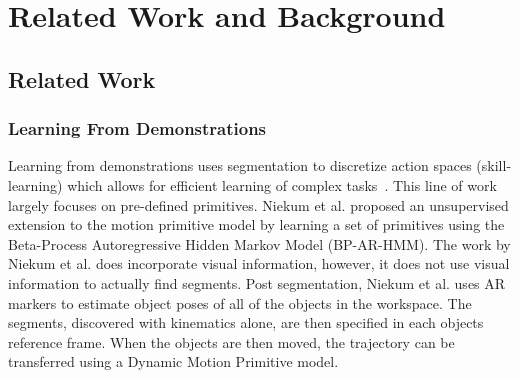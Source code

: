 \section{Related Work and Background}

\subsection{Related Work}

\subsubsection{Learning From Demonstrations}
Learning from demonstrations uses segmentation to discretize action spaces (skill-learning) which allows for efficient learning of complex tasks~\cite{ijspreet2002learning,pastor2009learning}.
This line of work largely focuses on pre-defined primitives.
Niekum et al. \cite{niekum2012learning} proposed an unsupervised extension to the motion primitive model by learning a set of primitives using the Beta-Process Autoregressive Hidden Markov Model (BP-AR-HMM).
The work by Niekum et al. does incorporate visual information, however, it does not use visual information to actually find segments.
Post segmentation,  Niekum et al. uses AR markers to estimate object poses of all of the objects in the workspace.
The segments, discovered with kinematics alone, are then specified in each objects reference frame.
When the objects are then moved, the trajectory can be transferred using a Dynamic Motion Primitive model.

